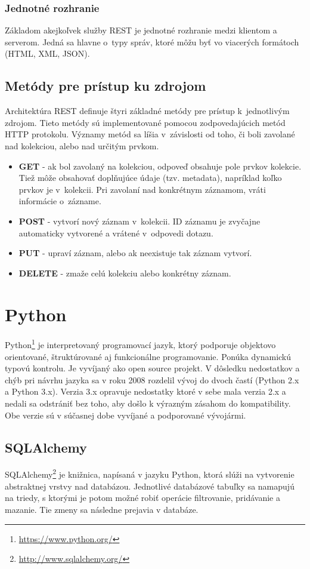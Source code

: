 \documentclass[slovak]{fitthesis}
\begin{document}
\subsubsection{Jednotné rozhranie}
Základom akejkoľvek služby REST je jednotné rozhranie medzi klientom a serverom. Jedná sa hlavne o~typy správ, ktoré môžu byť vo viacerých formátoch (HTML, XML, JSON).

\subsection{Metódy pre prístup ku zdrojom}\label{httpMetody}
Architektúra REST definuje štyri základné metódy pre prístup k~jednotlivým zdrojom. Tieto metódy sú implementované pomocou zodpovedajúcich metód HTTP protokolu. Významy metód sa líšia v~závislosti od toho, či boli zavolané nad kolekciou, alebo nad určitým prvkom.
\begin{itemize}
    \item \textbf{GET} - ak bol zavolaný na kolekciou, odpoveď obsahuje pole prvkov kolekcie. Tiež môže obsahovať doplňujúce údaje (tzv. metadata), napríklad koľko prvkov je v~kolekcii.
    Pri zavolaní nad konkrétnym záznamom, vráti informácie o~zázname.
    \item \textbf{POST} - vytvorí nový záznam v~kolekcii. ID záznamu je zvyčajne automaticky vytvorené a vrátené v~odpovedi dotazu.
    \item \textbf{PUT} - upraví záznam, alebo ak neexistuje tak záznam vytvorí.
    \item \textbf{DELETE} - zmaže celú kolekciu alebo konkrétny záznam.
\end{itemize}

\section{Python}\label{python}
Python\footnote{\url{https://www.python.org/}} je interpretovaný programovací jazyk, ktorý podporuje objektovo orientované, štruktúrované aj funkcionálne programovanie. Ponúka dynamickú typovú kontrolu. Je vyvíjaný ako open source projekt. V dôsledku nedostatkov a chýb pri návrhu jazyka sa v roku 2008 rozdelil vývoj do dvoch častí (Python 2.x a Python 3.x). Verzia 3.x opravuje nedostatky ktoré v sebe mala verzia 2.x a nedali sa odstrániť bez toho, aby došlo k výrazným zásahom do kompatibility. Obe verzie sú v súčasnej dobe vyvíjané a podporované vývojármi.

\subsection{SQLAlchemy}\label{SQLAlchemy}
SQLAlchemy\footnote{\url{http://www.sqlalchemy.org/}} je knižnica, napísaná v jazyku Python, ktorá slúži na vytvorenie abstraktnej vrstvy nad databázou. Jednotlivé databázové tabuľky sa namapujú na triedy, s ktorými je potom možné robiť operácie filtrovanie, pridávanie a mazanie. Tie zmeny sa následne prejavia v databáze.
\end{document}
